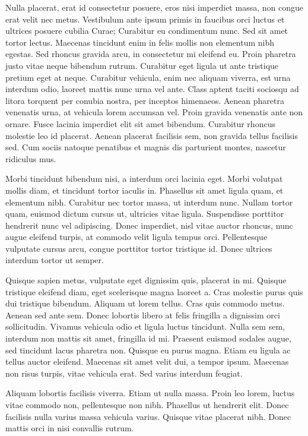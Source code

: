 \documentclass[a4paper]{article}
\begin{document}
Nulla placerat, erat id consectetur posuere, eros nisi imperdiet massa, non congue erat velit nec metus. Vestibulum ante ipsum primis in faucibus orci luctus et ultrices posuere cubilia Curae; Curabitur eu condimentum nunc. Sed sit amet tortor lectus. Maecenas tincidunt enim in felis mollis non elementum nibh egestas. Sed rhoncus gravida arcu, in consectetur mi eleifend eu. Proin pharetra justo vitae neque bibendum rutrum. Curabitur eget ligula ut ante tristique pretium eget at neque. Curabitur vehicula, enim nec aliquam viverra, est urna interdum odio, laoreet mattis nunc urna vel ante. Class aptent taciti sociosqu ad litora torquent per conubia nostra, per inceptos himenaeos. Aenean pharetra venenatis urna, at vehicula lorem accumsan vel. Proin gravida venenatis ante non ornare. Fusce lacinia imperdiet elit sit amet bibendum. Curabitur rhoncus molestie leo id placerat. Aenean placerat facilisis sem, non gravida tellus facilisis sed. Cum sociis natoque penatibus et magnis dis parturient montes, nascetur ridiculus mus.

Morbi tincidunt bibendum nisi, a interdum orci lacinia eget. Morbi volutpat mollis diam, et tincidunt tortor iaculis in. Phasellus sit amet ligula quam, et elementum nibh. Curabitur nec tortor massa, ut interdum nunc. Nullam tortor quam, euismod dictum cursus ut, ultricies vitae ligula. Suspendisse porttitor hendrerit nunc vel adipiscing. Donec imperdiet, nisl vitae auctor rhoncus, nunc augue eleifend turpis, at commodo velit ligula tempus orci. Pellentesque vulputate cursus arcu, congue porttitor tortor tristique id. Donec ultrices interdum tortor ut semper.

Quisque sapien metus, vulputate eget dignissim quis, placerat in mi. Quisque tristique eleifend diam, eget scelerisque magna laoreet a. Cras molestie purus quis dui tristique bibendum. Aliquam ut lorem tellus. Cras quis commodo metus. Aenean sed ante sem. Donec lobortis libero at felis fringilla a dignissim orci sollicitudin. Vivamus vehicula odio et ligula luctus tincidunt. Nulla sem sem, interdum non mattis sit amet, fringilla id mi. Praesent euismod sodales augue, sed tincidunt lacus pharetra non. Quisque eu purus magna. Etiam eu ligula ac tellus auctor eleifend. Maecenas sit amet velit dui, a tempor ipsum. Maecenas non risus turpis, vitae vehicula erat. Sed varius interdum feugiat.

Aliquam lobortis facilisis viverra. Etiam ut nulla massa. Proin leo lorem, luctus vitae commodo non, pellentesque non nibh. Phasellus ut hendrerit elit. Donec facilisis nulla varius massa vehicula varius. Quisque vitae placerat nibh. Donec mattis orci in nisi convallis rutrum.
\end{document}
